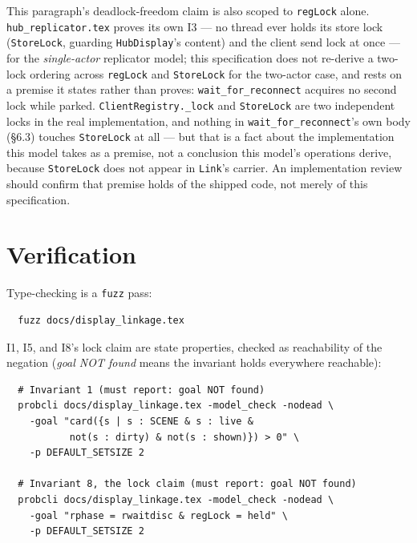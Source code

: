\documentclass[a4paper,10pt,fleqn]{article}
\begin{document}
This paragraph's deadlock-freedom claim is also scoped to
\texttt{regLock} alone.  \texttt{hub\_replicator.tex} proves its own I3
--- no thread ever holds its store lock (\texttt{StoreLock}, guarding
\texttt{HubDisplay}'s content) and the client send lock at once --- for
the \emph{single-actor} replicator model; this specification does not
re-derive a two-lock ordering across \texttt{regLock} and
\texttt{StoreLock} for the two-actor case, and rests on a premise it
states rather than proves: \texttt{wait\_for\_reconnect} acquires no
second lock while parked. \texttt{ClientRegistry.\_lock} and
\texttt{StoreLock} are two independent locks in the real implementation,
and nothing in \texttt{wait\_for\_reconnect}'s own body (\S6.3) touches
\texttt{StoreLock} at all --- but that is a fact about the implementation
this model takes as a premise, not a conclusion this model's operations
derive, because \texttt{StoreLock} does not appear in \texttt{Link}'s
carrier. An implementation review should confirm that premise holds of
the shipped code, not merely of this specification.

\section{Verification}
\label{sec:verify}

Type-checking is a \texttt{fuzz} pass:
\begin{verbatim}
  fuzz docs/display_linkage.tex
\end{verbatim}

I1, I5, and I8's lock claim are state properties, checked as reachability
of the negation (\emph{goal NOT found} means the invariant holds
everywhere reachable):
\begin{verbatim}
  # Invariant 1 (must report: goal NOT found)
  probcli docs/display_linkage.tex -model_check -nodead \
    -goal "card({s | s : SCENE & s : live &
           not(s : dirty) & not(s : shown)}) > 0" \
    -p DEFAULT_SETSIZE 2

  # Invariant 8, the lock claim (must report: goal NOT found)
  probcli docs/display_linkage.tex -model_check -nodead \
    -goal "rphase = rwaitdisc & regLock = held" \
    -p DEFAULT_SETSIZE 2
\end{verbatim}
\end{document}
